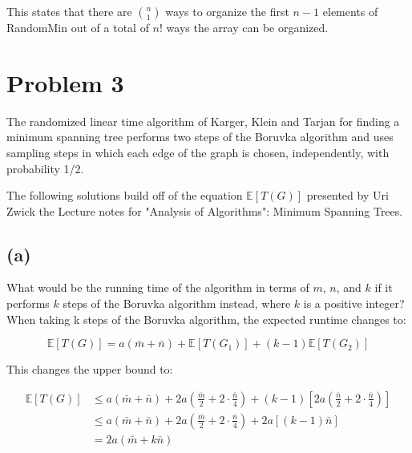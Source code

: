 \documentclass[12pt]{article}
\begin{document}
This states that there are $\binom{n}{1}$ ways to organize the first $n
- 1$ elements of RandomMin out of a total of $n!$ ways the array can be
organized.



\section*{Problem 3}
The randomized linear time algorithm of Karger, Klein and Tarjan for
finding a minimum spanning tree performs two steps of the Boruvka
algorithm and uses sampling steps in which each edge of the graph is
chosen, independently, with probability 1/2.\newline

The following solutions build off of the equation $\mathbb{E}[T(G)]$
presented by Uri Zwick the Lecture notes for "Analysis of
Algorithms": Minimum Spanning Trees.


\subsection*{(a)}
What would be the running time of the algorithm in terms of $m$, $n$,
and $k$ if it performs $k$ steps of the Boruvka algorithm instead,
where $k$ is a positive integer?\\

When taking k steps of the Boruvka algorithm, the expected runtime changes
to:

\begin{equation*}
    \mathbb{E}[T(G)] = a(\bar{m} + \bar{n}) + \mathbb{E}[T(G_1)] +
    (k-1)\mathbb{E}[T(G_2)]
\end{equation*}

This changes the upper bound to:

\begin{align*}
    \mathbb{E}[T(G)] &\le a(\bar{m} + \bar{n}) 
        + 2a\left(\frac{\bar{m}}{2} + 2\cdot\frac{\bar{n}}{4}\right)
        + (k-1)\left[2a\left(\frac{\bar{n}}{2} + 2\cdot\frac{\bar{n}}{4}\right)\right] \\
                     &\le a(\bar{m} + \bar{n})
        + 2a\left(\frac{\bar{m}}{2} + 2\cdot\frac{\bar{n}}{4}\right)
        + 2a[(k-1)\bar{n}]\\
                     &= 2a(\bar{m} + k\bar{n})
\end{align*}
\end{document}
